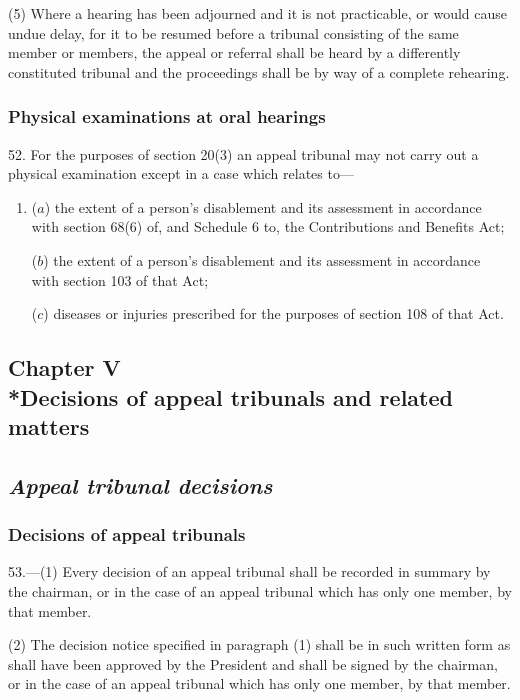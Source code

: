 \documentclass[12pt,a4paper]{article}
\begin{document}
(5) Where a hearing has been adjourned and it is not practicable, or would cause undue delay, for it to be resumed before a tribunal consisting of the same member or members, the appeal or referral shall be heard by a differently constituted tribunal and the proceedings shall be by way of a complete rehearing.

\subsubsection[52. Physical examinations at oral hearings]{Physical examinations at oral hearings}

52.  For the purposes of section 20(3) an appeal tribunal may not carry out a physical examination except in a case which relates to—
\begin{enumerate}\item[]
($a$) the extent of a person’s disablement and its assessment in accordance with section 68(6) of, and Schedule 6 to, the Contributions and Benefits Act;

($b$) the extent of a person’s disablement and its assessment in accordance with section 103 of that Act;

($c$) diseases or injuries prescribed for the purposes of section 108 of that Act.
\end{enumerate}

\subsection[Chapter V --- Decisions of appeal tribunals and related matters]{Chapter V\\*Decisions of appeal tribunals and related matters}

\subsection{\itshape Appeal tribunal decisions}

\subsubsection[53. Decisions of appeal tribunals]{Decisions of appeal tribunals}

53.—(1) Every decision of an appeal tribunal shall be recorded in summary by the chairman, or in the case of an appeal tribunal which has only one member, by that member.

(2) The decision notice specified in paragraph (1) shall be in such written form as shall have been approved by the President and shall be signed by the chairman, or in the case of an appeal tribunal which has only one member, by that member.
\end{document}

